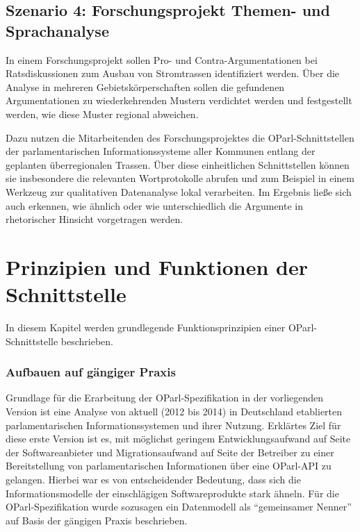 \documentclass[,a4paper]{article}
\begin{document}
\subsection{Szenario 4: Forschungsprojekt Themen- und
Sprachanalyse}\label{szenarioux5fforschung}

In einem Forschungsprojekt sollen Pro- und Contra-Argumentationen bei
Ratsdiskussionen zum Ausbau von Stromtrassen identifiziert werden. Über
die Analyse in mehreren Gebietskörperschaften sollen die gefundenen
Argumentationen zu wiederkehrenden Mustern verdichtet werden und
festgestellt werden, wie diese Muster regional abweichen.

Dazu nutzen die Mitarbeitenden des Forschungsprojektes die
OParl-Schnittstellen der parlamentarischen Informationssysteme aller
Kommunen entlang der geplanten überregionalen Trassen. Über diese
einheitlichen Schnittstellen können sie insbesondere die relevanten
Wortprotokolle abrufen und zum Beispiel in einem Werkzeug zur
qualitativen Datenanalyse lokal verarbeiten. Im Ergebnis ließe sich auch
erkennen, wie ähnlich oder wie unterschiedlich die Argumente in
rhetorischer Hinsicht vorgetragen werden.

\section{Prinzipien und Funktionen der
Schnittstelle}\label{prinzipien-und-funktionen-der-schnittstelle}

In diesem Kapitel werden grundlegende Funktionsprinzipien einer
OParl-Schnittstelle beschrieben.


\subsubsection{Aufbauen auf gängiger
Praxis}\label{aufbauen-auf-guxe4ngiger-praxis}

Grundlage für die Erarbeitung der OParl-Spezifikation in der
vorliegenden Version ist eine Analyse von aktuell (2012 bis 2014) in
Deutschland etablierten parlamentarischen Informationssystemen und ihrer
Nutzung. Erklärtes Ziel für diese erste Version ist es, mit möglichst
geringem Entwicklungsaufwand auf Seite der Softwareanbieter und
Migrationsaufwand auf Seite der Betreiber zu einer Bereitstellung von
parlamentarischen Informationen über eine OParl-API zu gelangen. Hierbei
war es von entscheidender Bedeutung, dass sich die Informationsmodelle
der einschlägigen Softwareprodukte stark ähneln. Für die
OParl-Spezifikation wurde sozusagen ein Datenmodell als ``gemeinsamer
Nenner'' auf Basis der gängigen Praxis beschrieben.
\end{document}
